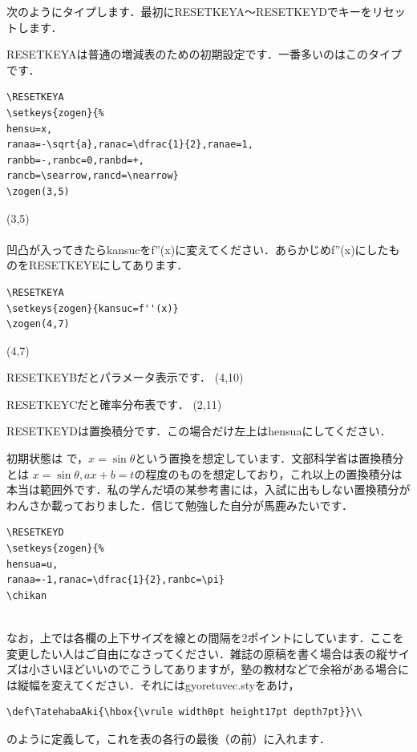 \documentclass [10pt,fleqn,b5paper]{jsarticlek}
\begin{document}
{{次のようにタイプします．最初にRESETKEYA〜RESETKEYDでキーをリセットします．

RESETKEYAは普通の増減表のための初期設定です．一番多いのはこのタイプです．
\aki\\
\aki
\begin{Verbatim}
\RESETKEYA
\setkeys{zogen}{%
hensu=x,
ranaa=-\sqrt{a},ranac=\dfrac{1}{2},ranae=1,
ranbb=-,ranbc=0,ranbd=+,
rancb=\searrow,rancd=\nearrow}
\zogen(3,5)
\end{Verbatim}

\RESETKEYA
{}
\zogen(3,5)
\\
\\
凹凸が入ってきたらkansucをf''(x)に変えてください．あらかじめf''(x)にしたものをRESETKEYEにしてあります．
\aki\\
\aki
\begin{Verbatim}
\RESETKEYA
\setkeys{zogen}{kansuc=f''(x)}
\zogen(4,7)
\end{Verbatim}

\RESETKEYA
{}
\zogen(4,7)

RESETKEYBだとパラメータ表示です．
\RESETKEYB
\zogen(4,10)

RESETKEYCだと確率分布表です．
\RESETKEYC
\zogen(2,11)

RESETKEYDは置換積分です．この場合だけ左上はhensuaにしてください．

初期状態は
\RESETKEYD
\chikan
で，$x=\sin \theta$という置換を想定しています．文部科学省は置換積分とは
$x=\sin \theta,ax+b=t$の程度のものを想定しており，これ以上の置換積分は本当は範囲外です．私の学んだ頃の某参考書には，入試に出もしない置換積分がわんさか載っておりました．信じて勉強した自分が馬鹿みたいです．
\aki\\
\aki
\begin{Verbatim}
\RESETKEYD
\setkeys{zogen}{%
hensua=u,
ranaa=-1,ranac=\dfrac{1}{2},ranbc=\pi}
\chikan
\end{Verbatim}
\RESETKEYD
{}
\chikan
\aki\\
\aki
なお，上では各欄の上下サイズを線との間隔を2ポイントにしています．ここを変更したい人はご自由になさってください．雑誌の原稿を書く場合は表の縦サイズは小さいほどいいのでこうしてありますが，塾の教材などで余裕がある場合には縦幅を変えてください．それにはgyoretuvec.styをあけ，
\aki\\
\aki
\begin{Verbatim}
\def\TatehabaAki{\hbox{\vrule width0pt height17pt depth7pt}}\\
\end{Verbatim}
のように定義して，これを表の各行の最後（\yy \yy の前）に入れます．

}}
\end{document}
